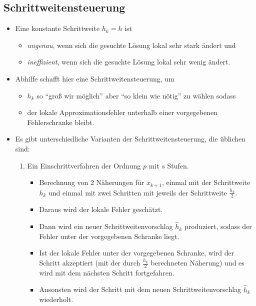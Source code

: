\documentclass[a4paper, 11pt, accentcolor = tud3b]{tudreport}
\begin{document}
            \subsection{Schrittweitensteuerung} %
	            \begin{itemize}
	            	\item Eine konstante Schrittweite \( h _ k = h \) ist
		            	\begin{itemize}
		            		\item \textit{ungenau}, wenn sich die gesuchte Lösung lokal sehr stark ändert und
		            		\item \textit{ineffizient}, wenn sich die gesuchte Lösung lokal sehr wenig ändert.
		            	\end{itemize}
		            \item Abhilfe schafft hier eine Schrittweitensteuerung, um
			            \begin{itemize}
			            	\item \( h _ k \) so \enquote{groß wir möglich} aber \enquote{so klein wie nötig} zu wählen sodass
			            	\item der lokale Approximationsfehler unterhalb einer vorgegebenen Fehlerschranke bleibt.
			            \end{itemize}
					\item Es gibt unterschiedliche Varianten der Schrittweitensteuerung, die üblichen sind:
						\begin{enumerate}
							\item Ein Einschrittverfahren der Ordnung \( p \) mit \( s \) Stufen.
								\begin{itemize}
									\item Berechnung von 2 Näherungen für \( x _ { k + 1 } \), einmal mit der Schrittweite \( h _ k \) und einmal mit zwei Schritten mit jeweils der Schrittweite \( \frac{h _ k}{2} \).
									\item Daraus wird der lokale Fehler geschätzt.
									\item Dann wird ein neuer Schrittweitenvorschlag \( \hat{h} _ k \) produziert, sodass der Fehler unter der vorgegebenen Schranke liegt.
									\item Ist der lokale Fehler unter der vorgegebenen Schranke, wird der Schritt akzeptiert (mit der durch \( \frac{h _ k}{2} \) berechneten Näherung) und es wird mit dem nächsten Schritt fortgefahren.
									\item Ansonsten wird der Schritt mit dem neuen Schrittweitenvorschlag \( \hat{h} _ k \) wiederholt.

\end{itemize}
\end{enumerate}
\end{itemize}
\end{document}
